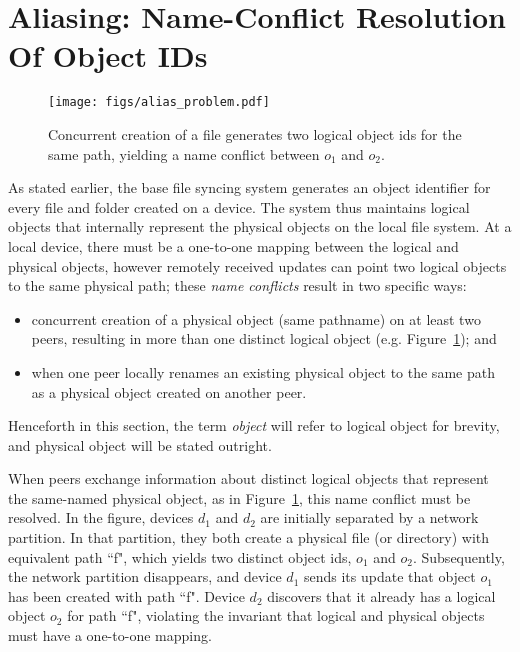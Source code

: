 \section*{Aliasing: Name-Conflict Resolution Of Object IDs}

\begin{figure}[t]
\centering
\texttt{[image: figs/alias\_problem.pdf]}
\caption{Concurrent creation of a file generates two logical object ids for the
same path, yielding a name conflict between $o_1$ and $o_2$.}
\label{fig:aliasproblem}
\end{figure}

As stated earlier, the base file syncing system generates an object identifier
for every file and folder created on a device. The system thus maintains logical
objects that internally represent the physical objects on the local file system.
At a local device, there must be a one-to-one mapping between the logical and
physical objects, however remotely received updates can point two logical
objects to the same physical path; these {\em name conflicts} result in two
specific ways:
\begin{itemize}
\item
concurrent creation of a physical object (same pathname) on at least two
peers, resulting in more than one distinct logical object (e.g.
Figure~\ref{fig:aliasproblem}); and
\item
when one peer locally renames an existing physical object to the same path
as a physical object created on another peer.
\end{itemize}
Henceforth in this section, the term {\em object} will refer to logical object
for brevity, and physical object will be stated outright.

When peers exchange information about distinct logical objects that represent
the same-named physical object, as in Figure~\ref{fig:aliasproblem}, this
name conflict must be resolved. In the figure, devices $d_1$ and $d_2$ are
initially separated by a network partition. In that partition, they both
create a physical file (or directory) with equivalent path ``f", which yields
two distinct object ids, $o_1$ and $o_2$. Subsequently, the network partition
disappears, and device $d_1$ sends its update that object $o_1$ has been created
with path ``f". Device $d_2$ discovers that it already has a logical object
$o_2$ for path ``f", violating the invariant that logical and physical objects
must have a one-to-one mapping.


